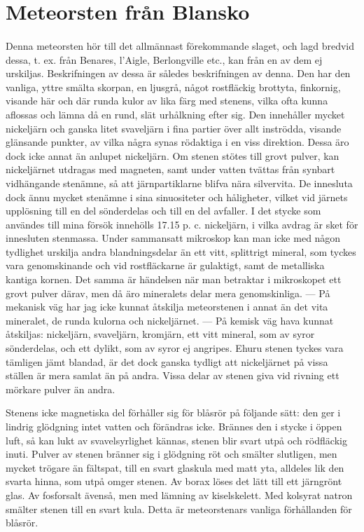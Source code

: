 \documentclass[a4paper, 12pt, oneside, swedish]{article}
\begin{document}
\section{Meteorsten från Blansko}
\paragraph{}
Denna meteorsten hör till det allmännast förekommande slaget, och lagd bredvid dessa, t. ex. från Benares, l'Aigle, Berlongville etc., kan från en av dem ej urskiljas. Beskrifningen av dessa är således beskrifningen av denna. Den har den vanliga, yttre smälta skorpan, en ljusgrå, något rostfläckig brottyta, finkornig, visande här och där runda kulor av lika färg med stenens, vilka ofta kunna aflossas och lämna då en rund, slät urhålkning efter sig. Den innehåller mycket nickeljärn och ganska litet svaveljärn i fina partier över allt inströdda, visande glänsande punkter, av vilka några synas rödaktiga i en viss direktion. Dessa äro dock icke annat än anlupet nickeljärn. Om stenen stötes till grovt pulver, kan nickeljärnet utdragas med magneten, samt under vatten tvättas från synbart vidhängande stenämne, så att järnpartiklarne blifva nära silvervita. De innesluta dock ännu mycket stenämne i sina sinuositeter och håligheter, vilket vid järnets upplösning till en del sönderdelas och till en del avfaller. I det stycke som användes till mina försök innehölls 17.15 p. c. nickeljärn, i vilka avdrag är sket för innesluten stenmassa. Under sammansatt mikroskop kan man icke med någon tydlighet urskilja andra blandningsdelar än ett vitt, splittrigt mineral, som tyckes vara genomskinande och vid rostfläckarne är gulaktigt, samt de metalliska kantiga kornen. Det samma är händelsen när man betraktar i mikroskopet ett grovt pulver därav, men då äro mineralets delar mera genomskinliga. --- På mekanisk väg har jag icke kunnat åtskilja meteorstenen i annat än det vita mineralet, de runda kulorna och nickeljärnet. --- På kemisk väg hava kunnat åtskiljas: nickeljärn, svaveljärn, kromjärn, ett vitt mineral, som av syror sönderdelas, och ett dylikt, som av syror ej angripes. Ehuru stenen tyckes vara tämligen jämt blandad, är det dock ganska tydligt att nickeljärnet på vissa ställen är mera samlat än på andra. Vissa delar av stenen giva vid rivning ett mörkare pulver än andra.

Stenens icke magnetiska del förhåller sig för blåsrör på följande sätt: den ger i lindrig glödgning intet vatten och förändras icke. Brännes den i stycke i öppen luft, så kan lukt av svavelsyrlighet kännas, stenen blir svart utpå och rödfläckig inuti. Pulver av stenen bränner sig i glödgning röt och smälter slutligen, men mycket trögare än fältspat, till en svart glaskula med matt yta, alldeles lik den svarta hinna, som utpå omger stenen. Av borax löses det lätt till ett järngrönt glas. Av fosforsalt ävenså, men med lämning av kiselskelett. Med kolsyrat natron smälter stenen till en svart kula. Detta är meteorstenars vanliga förhållanden för blåsrör.
\end{document}
